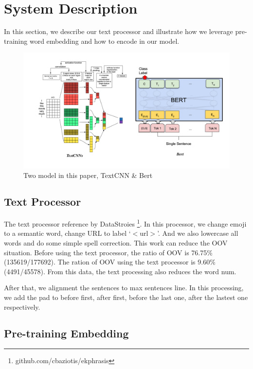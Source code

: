 \section{System Description}
In this section, we describe our text processor and illustrate how we leverage pre-training word embedding and how to encode in our model. 
\begin{figure}[t]
    \begin{center}
        \includegraphics[width=\textwidth]{figures/figure.pdf}
    \end{center}
    \caption{Two model in this paper, TextCNN \& Bert}
    \label{fig:model}
\end{figure}

    
\subsection{Text Processor}
The text processor reference by DataStroies \cite{biaziotis2017datastories}\footnote{github.com/cbaziotis/ekphrasis}. In this processor, we change emoji to a semantic word, change URL to label `$<$url$>$'. And we also lowercase all words and do some simple spell correction. This work can reduce the OOV situation. Before using the text processor, the ratio of OOV is 76.75\%(135619/177692). The ration of OOV using the text processor is 9.60\%(4491/45578). From this data, the text processing also reduces the word num.

After that, we alignment the sentences to max sentences line. In this processing, we add the pad to before first, after first, before the last one, after the lastest one respectively.

\subsection{Pre-training Embedding}

